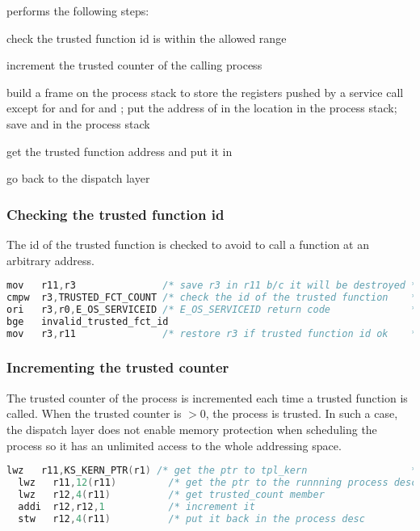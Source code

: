  performs the following steps:

\begin{penum}
\item check the trusted function id is within the allowed range
\item increment the trusted counter of the calling process
\item build a frame on the process stack to store the registers pushed by a service call except for  and for  and ; put the address of  in the  location in the process stack; save  and  in the process stack
\item get the trusted function address and put it in 
\item go back to the dispatch layer
\end{penum}

\subsubsection{Checking the trusted function id}

The id of the trusted function is checked to avoid to call a function at an arbitrary address.

\begin{lstlisting}[language=C]
mov   r11,r3               /* save r3 in r11 b/c it will be destroyed */
cmpw  r3,TRUSTED_FCT_COUNT /* check the id of the trusted function    */
ori   r3,r0,E_OS_SERVICEID /* E_OS_SERVICEID return code              */
bge   invalid_trusted_fct_id
mov   r3,r11               /* restore r3 if trusted function id ok    */
\end{lstlisting}

\subsubsection{Incrementing the trusted counter}

The trusted counter of the process is incremented each time a trusted function is called. When the trusted counter is $>0$, the process is trusted. In such a case, the dispatch layer does not enable memory protection when scheduling the process so it has an unlimited access to the whole addressing space.

\begin{lstlisting}[language=C]
  lwz   r11,KS_KERN_PTR(r1) /* get the ptr to tpl_kern                  */
  lwz   r11,12(r11)         /* get the ptr to the runnning process desc */
  lwz   r12,4(r11)          /* get trusted_count member                 */
  addi  r12,r12,1           /* increment it                             */
  stw   r12,4(r11)          /* put it back in the process desc          */
\end{lstlisting}

